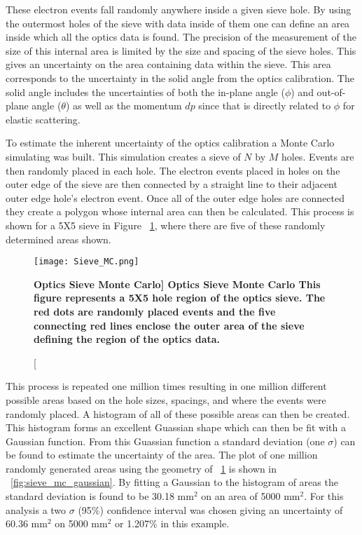 These electron events fall randomly anywhere inside a given sieve hole. By using the outermost holes of the sieve with data inside of them one can define an area inside which all the optics data is found. The precision of the measurement of the size of this internal area is limited by the size and spacing of the sieve holes. This gives an uncertainty on the area containing data within the sieve. This area corresponds to the uncertainty in the solid angle from the optics calibration. The solid angle includes the uncertainties of both the in-plane angle ($\phi$) and out-of-plane angle ($\theta$) as well as the momentum $dp$ since that is directly related to $\phi$ for elastic scattering.  

To estimate the inherent uncertainty of the optics calibration a Monte Carlo simulating was built. This simulation creates a sieve of $N$ by $M$ holes. Events are then randomly placed in each hole. The electron events placed in holes on the outer edge of the sieve are then connected by a straight line to their adjacent outer edge hole's electron event. Once all of the outer edge holes are connected they create a polygon whose internal area can then be calculated. This process is shown for a 5X5 sieve in Figure ~\ref{fig:sieve_mc}, where there are five of these randomly determined areas shown. 

\begin{figure}[!ht]
\begin{center}
\texttt{[image: Sieve\_MC.png]}
\end{center}
\caption[\bf{Optics Sieve Monte Carlo}]{
{\bf{Optics Sieve Monte Carlo}} This figure represents a 5X5 hole region of the optics sieve. The red dots are randomly placed events and the five connecting red lines enclose the outer area of the sieve defining the region of the optics data.}
\label{fig:sieve_mc}
\end{figure}

This process is repeated one million times resulting in one million different possible areas based on the hole sizes, spacings, and where the events were randomly placed. A histogram of all of these possible areas can then be created. This histogram forms an excellent Guassian shape which can then be fit with a Gaussian function. From this Guassian function a standard deviation (one $\sigma$) can be found to estimate the uncertainty of the area. The plot of one million randomly generated areas using the geometry of ~\ref{fig:sieve_mc} is shown in ~\ref{fig:sieve_mc_gaussian}. By fitting a Gaussian to the histogram of areas the standard deviation is found to be 30.18 mm$^2$ on an area of 5000 mm$^2$. For this analysis a two $\sigma$ (95$\%$) confidence interval was chosen giving an uncertainty of 60.36 mm$^2$ on 5000 mm$^2$ or 1.207$\%$ in this example. 

